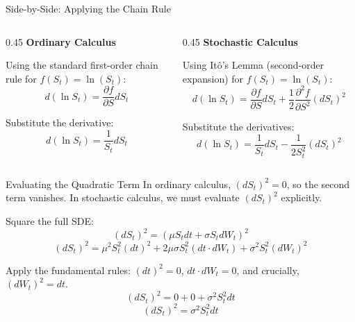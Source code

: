 \documentclass{beamer}
\begin{document}
\begin{frame}{Side-by-Side: Applying the Chain Rule}
\begin{columns}[T]
\begin{column}{0.45\textwidth}
\textbf{Ordinary Calculus}
\vspace{0.3cm}

Using the standard first-order chain rule for $f(S_t) = \ln(S_t)$:
\[ d(\ln S_t) = \frac{\partial f}{\partial S} dS_t \]

Substitute the derivative:
\[ d(\ln S_t) = \frac{1}{S_t} dS_t \]
\end{column}
\hfill\vrule\hfill
\begin{column}{0.45\textwidth}
\textbf{Stochastic Calculus}
\vspace{0.3cm}

Using It\^o's Lemma (second-order expansion) for $f(S_t) = \ln(S_t)$:
\[ d(\ln S_t) = \frac{\partial f}{\partial S} dS_t + \frac{1}{2}\frac{\partial^2 f}{\partial S^2}(dS_t)^2 \]

Substitute the derivatives:
\[ d(\ln S_t) = \frac{1}{S_t} dS_t - \frac{1}{2S_t^2}(dS_t)^2 \]
\end{column}
\end{columns}
\end{frame}

\begin{frame}{Evaluating the Quadratic Term}
In ordinary calculus, $(dS_t)^2 = 0$, so the second term vanishes. In stochastic calculus, we must evaluate $(dS_t)^2$ explicitly.

\vspace{0.3cm}
Square the full SDE:
\[ (dS_t)^2 = (\mu S_t dt + \sigma S_t dW_t)^2 \]
\[ (dS_t)^2 = \mu^2 S_t^2 (dt)^2 + 2\mu\sigma S_t^2 (dt \cdot dW_t) + \sigma^2 S_t^2 (dW_t)^2 \]

\vspace{0.3cm}
Apply the fundamental rules: $(dt)^2 = 0$, $dt \cdot dW_t = 0$, and crucially, $(dW_t)^2 = dt$.
\[ (dS_t)^2 = 0 + 0 + \sigma^2 S_t^2 dt \]
\[ (dS_t)^2 = \sigma^2 S_t^2 dt \]
\end{frame}
\end{document}
